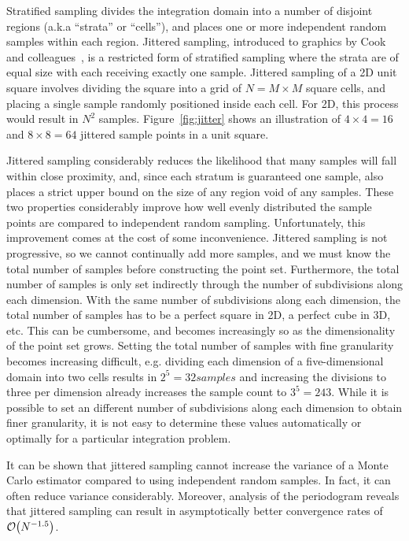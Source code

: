 \documentclass[11pt,fleqn]{book} %
\begin{document}
Stratified sampling divides the integration domain into a number of disjoint regions (a.k.a ``strata'' or ``cells''), and places one or more independent random samples within each region. Jittered sampling, introduced to graphics by Cook and colleagues~\cite{Cook:1986:SSC}, is a restricted form of stratified sampling where the strata are of equal size with each receiving exactly one sample. Jittered sampling of a 2D unit square involves dividing the square into a grid of $N = M\times M$ square cells, and placing a single sample randomly positioned inside each cell. For 2D, this process would result in $N^2$ samples. Figure~\ref{fig:jitter} shows an illustration of $4\times4 =16$  and $8\times8 =64$ jittered sample points in a unit square.


Jittered sampling considerably reduces the likelihood that many samples will fall within close proximity, and, since each stratum is guaranteed one sample, also places a strict upper bound on the size of any region void of any samples. These two properties considerably improve how well evenly distributed the sample points are compared to independent random sampling. Unfortunately, this improvement comes at the cost of some inconvenience. Jittered sampling is not progressive, so we cannot continually add more samples, and we must know the total number of samples before constructing the point set. Furthermore, the total number of samples is only set indirectly through the number of subdivisions along each dimension. With the same number of subdivisions along each dimension, the total number of samples has to be a perfect square in 2D, a perfect cube in 3D, etc. This can be cumbersome, and becomes increasingly so as the dimensionality of the point set grows. Setting the total number of samples with fine granularity becomes increasing difficult, e.g. dividing each dimension of a five-dimensional domain into two cells results in $2^5 = 32 samples$ and increasing the divisions to three per dimension already increases the sample count to $3^5 = 243$. While it is possible to set an different number of subdivisions along each dimension to obtain finer granularity, it is not easy to determine these values automatically or optimally for a particular integration problem.

It can be shown that jittered sampling cannot increase the variance of a Monte Carlo estimator compared to using independent random samples. In fact, it can often reduce variance considerably. Moreover, analysis of the periodogram reveals that jittered sampling can result in asymptotically better convergence rates of $\mathcal{O}\!\left(N^{-1.5}\right)$.%
%
%
%
%
%
%
%
\end{document}
